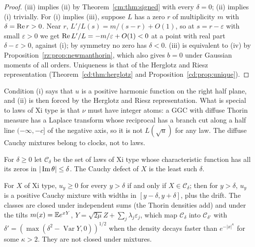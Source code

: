 \begin{proof}
(iii) implies (ii) by Theorem~\ref{cm:thm:signed} with every $\delta=0$; (ii) implies (i) trivially. For (i) implies (iii), suppose $L$ has a zero $r$ of multiplicity $m$ with $\delta=\operatorname{Re} r>0$. Near $r$, $L'/L(s)=m/(s-r)+O(1)$, so at $s=r-\varepsilon$ with small $\varepsilon>0$ we get $\operatorname{Re} L'/L=-m/\varepsilon+O(1)<0$ at a point with real part $\delta-\varepsilon>0$, against (i); by symmetry no zero has $\delta<0$. (iii) is equivalent to (iv) by Proposition~\ref{rz:prop:newmanthorin}, which also gives $b=0$ under Gaussian moments of all orders. Uniqueness is that of the Herglotz and Riesz representation (Theorem~\ref{cd:thm:herglotz} and Proposition~\ref{cd:prop:unique}).
\end{proof}

\begin{remark}\label{cm:rem:integer}
Condition (i) says that $u$ is a positive harmonic function on the right half plane, and (ii) is then forced by the Herglotz and Riesz representation. What is special to laws of Xi type is that $\nu$ must have integer atoms: a GGC with diffuse Thorin measure has a Laplace transform whose reciprocal has a branch cut along a half line $(-\infty,-c]$ of the negative axis, so it is not $L(\sqrt u)$ for any law. The diffuse Cauchy mixtures belong to clocks, not to laws.
\end{remark}

\begin{definition}\label{cm:def:strip}
For $\delta\ge0$ let $\mathcal C_\delta$ be the set of laws of Xi type whose characteristic function has all its zeros in $|\operatorname{Im}\theta|\le\delta$. The Cauchy defect of $X$ is the least such $\delta$.
\end{definition}

\begin{proposition}\label{cm:prop:strip}
For $X$ of Xi type, $u_y\ge0$ for every $y>\delta$ if and only if $X\in\mathcal C_\delta$; then for $y>\delta$, $u_y$ is a positive Cauchy mixture with widths in $[y-\delta,y+\delta]$, plus the drift. The classes are closed under independent sums (the Thorin densities add) and under the tilts $m(x)=\mathbb{E} e^{xY}$, $Y=\sqrt{2\mu}Z+\sum_j\lambda_j\varepsilon_j$, which map $\mathcal C_\delta$ into $\mathcal C_{\delta'}$ with $\delta'=(\max(\delta^2-\operatorname{Var}Y,0))^{1/2}$ when the density decays faster than $e^{-|x|^\kappa}$ for some $\kappa>2$. They are not closed under mixtures.
\end{proposition}


